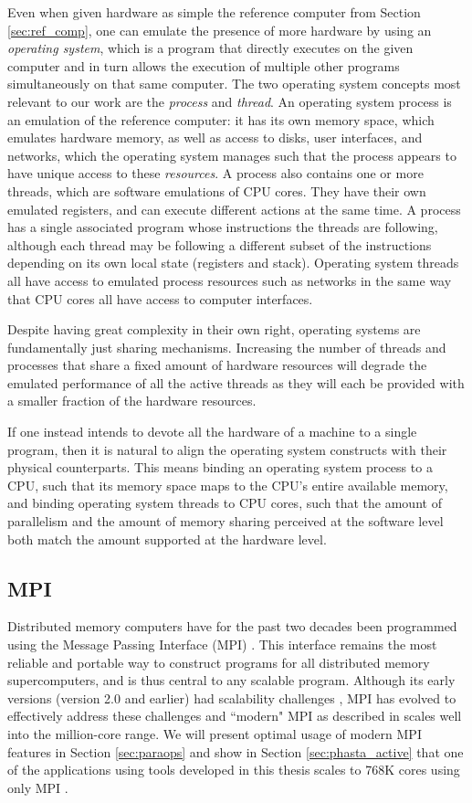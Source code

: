 Even when given hardware as simple the reference
computer from Section \ref{sec:ref_comp}, one can emulate
the presence of more hardware by using an \emph{operating system},
which is a program that directly executes on the given computer
and in turn allows the execution of multiple other programs
simultaneously on that same computer.
The two operating system concepts most relevant to our work
are the \emph{process} and \emph{thread}.
An operating system process is an emulation of the reference computer:
it has its own memory space, which emulates hardware memory,
as well as access to disks, user interfaces, and networks,
which the operating system manages such that the process
appears to have unique access to these \emph{resources}.
A process also contains one or more threads, which are
software emulations of CPU cores.
They have their own emulated registers, and can execute
different actions at the same time.
A process has a single associated program whose instructions
the threads are following, although each thread may be
following a different subset of the instructions depending
on its own local state (registers and stack).
Operating system threads all have access to emulated process
resources such as networks in the same way that CPU cores
all have access to computer interfaces.

Despite having great complexity in their own right, operating
systems are fundamentally just sharing mechanisms.
Increasing the number of threads and processes that share
a fixed amount of hardware resources will degrade the emulated
performance of all the active threads as they will each be
provided with a smaller fraction of the hardware resources.

If one instead intends to devote all the hardware of a machine
to a single program, then it is natural to align the operating
system constructs with their physical counterparts.
This means binding an operating system process to a CPU, such
that its memory space maps to the CPU's entire available memory,
and binding operating system threads to CPU cores, such that
the amount of parallelism and the amount of memory sharing
perceived at the software level both
match the amount supported at the hardware level.

\subsection{MPI}
\label{sec:def_mpi}

Distributed memory computers have for the past two decades
been programmed using the Message Passing Interface (MPI)
\cite{hempel1994mpi,walker1996mpi}.
This interface remains the most reliable and portable way to construct
programs for all distributed memory supercomputers,
and is thus central to any scalable program.
Although its early versions (version 2.0 and earlier) had
scalability challenges \cite{balaji2009mpi}, MPI has evolved
to effectively address these challenges and ``modern" MPI
as described in \cite{gropp2014using} scales well into the
million-core range.
We will present optimal usage of modern MPI features in
Section \ref{sec:paraops} and show in Section \ref{sec:phasta_active}
that one of the applications using tools developed
in this thesis scales to 768K cores using only MPI \cite{rasquinCise2014}.

